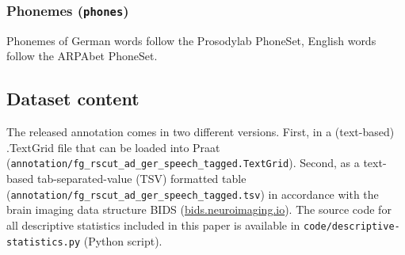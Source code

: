 \documentclass[10pt,a4paper,onecolumn]{article}
\begin{document}
\subsubsection*{Phonemes (\texttt{phones})}
Phonemes of German words follow the Prosodylab PhoneSet, English words follow the ARPAbet PhoneSet.

\subsection*{Dataset content}
The released annotation comes in two different versions. First, in a (text-based) .TextGrid file that can be loaded into Praat (\texttt{annotation/fg\_rscut\_ad\_ger\_speech\_tagged.TextGrid}).
Second, as a text-based tab-separated-value (TSV) formatted table  (\texttt{annotation/fg\_rscut\_ad\_ger\_speech\_tagged.tsv})  in accordance with the brain imaging data structure BIDS \citep{gorgolewski2016bids} (\href{https://bids.neuroimaging.io/}{bids.neuroimaging.io}). The source code for all descriptive statistics included in this paper is available in \texttt{code/descriptive-statistics.py} (Python script).
\end{document}
